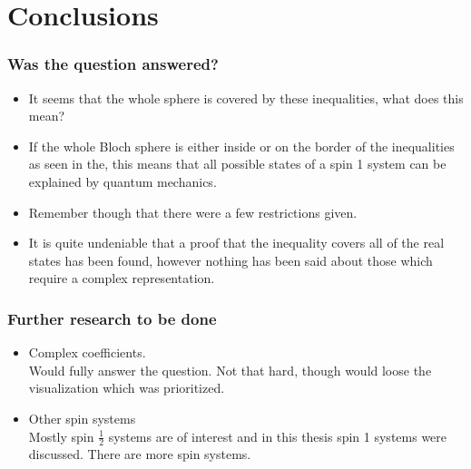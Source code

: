\documentclass[•]{beamer}
\theoremstyle{remark}
\begin{document}
\section{Conclusions}
\begin{frame}[shrink=10]\frametitle{Was the question answered?}
\begin{block}

\begin{itemize}
\item It seems that the whole sphere is covered by these inequalities, what does this mean?\\ 
\pause
\item If the whole Bloch sphere is either inside or on the border of the inequalities as seen in the, this means that all possible states of a spin 1 system can be explained by quantum mechanics.
\\
\pause
\item Remember though that there were a few restrictions given.
\\
\pause
\item It is quite undeniable that a proof that the inequality covers all of the real states has been found, however nothing has been said about those which require a complex representation. 
\end{itemize}
\end{block}
\end{frame}
\begin{frame}[shrink=10]\frametitle{Further research to be done}
\begin{block}

\begin{itemize}
\item Complex coefficients.\\
Would fully answer the question. Not that hard, though would loose the visualization which was prioritized.
\pause
\item Other spin systems\\
Mostly spin $\frac{1}{2}$ systems are of interest and in this thesis spin 1 systems were discussed.
There are more spin systems.

\end{itemize}

\end{block}
\end{frame}
\end{document}
